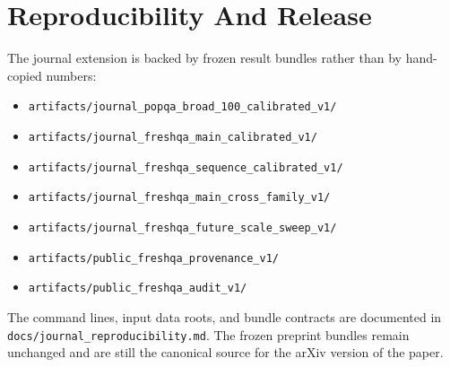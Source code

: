 \section{Reproducibility And Release}

The journal extension is backed by frozen result bundles rather than by hand-copied numbers:
\begin{itemize}[leftmargin=1.5em]
\item \texttt{artifacts/journal\_popqa\_broad\_100\_calibrated\_v1/}
\item \texttt{artifacts/journal\_freshqa\_main\_calibrated\_v1/}
\item \texttt{artifacts/journal\_freshqa\_sequence\_calibrated\_v1/}
\item \texttt{artifacts/journal\_freshqa\_main\_cross\_family\_v1/}
\item \texttt{artifacts/journal\_freshqa\_future\_scale\_sweep\_v1/}
\item \texttt{artifacts/public\_freshqa\_provenance\_v1/}
\item \texttt{artifacts/public\_freshqa\_audit\_v1/}
\end{itemize}

The command lines, input data roots, and bundle contracts are documented in \texttt{docs/journal\_reproducibility.md}. The frozen preprint bundles remain unchanged and are still the canonical source for the arXiv version of the paper.

